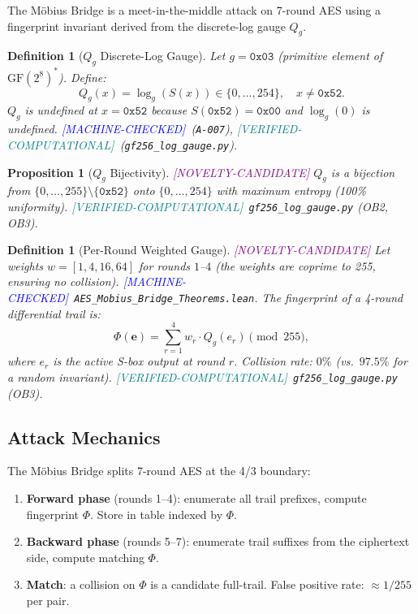 \documentclass[11pt,letterpaper]{article}
\newtheorem{definition}[theorem]{Definition}
\newtheorem{proposition}[theorem]{Proposition}
\newcommand{\MC}{\textcolor{blue}{[MACHINE-CHECKED]}}
\newcommand{\VC}{\textcolor{teal}{[VERIFIED-COMPUTATIONAL]}}
\newcommand{\CN}{\textcolor{purple}{[NOVELTY-CANDIDATE]}}
\begin{document}
The M\"obius Bridge is a meet-in-the-middle attack on 7-round AES using a
fingerprint invariant derived from the discrete-log gauge $Q_g$.

\begin{definition}[$Q_g$ Discrete-Log Gauge]
\label{def:qg}
Let $g = \mathtt{0x03}$ (primitive element of $\mathrm{GF}(2^8)^*$).
Define:
\[
Q_g(x) = \log_g(S(x)) \in \{0,\ldots,254\}, \quad x \neq \mathtt{0x52}.
\]
$Q_g$ is undefined at $x = \mathtt{0x52}$ because $S(\mathtt{0x52}) = \mathtt{0x00}$
and $\log_g(0)$ is undefined.
\MC\ (\texttt{A-007}), \VC\ (\texttt{gf256\_log\_gauge.py}).
\end{definition}

\begin{proposition}[$Q_g$ Bijectivity] \CN
$Q_g$ is a bijection from $\{0,\ldots,255\} \setminus \{\mathtt{0x52}\}$
onto $\{0,\ldots,254\}$ with maximum entropy (100\% uniformity).
\VC\ \texttt{gf256\_log\_gauge.py} (OB2, OB3).
\end{proposition}

\begin{definition}[Per-Round Weighted Gauge] \CN
Let weights $w = [1, 4, 16, 64]$ for rounds $1$--$4$ (the weights are
coprime to 255, ensuring no collision). \MC\ \texttt{AES\_Mobius\_Bridge\_Theorems.lean}.
The \emph{fingerprint} of a 4-round differential trail is:
\[
\Phi(\mathbf{e}) = \sum_{r=1}^4 w_r \cdot Q_g(e_r) \pmod{255},
\]
where $e_r$ is the active S-box output at round $r$.
Collision rate: $0\%$ (vs.\ $97.5\%$ for a random invariant).
\VC\ \texttt{gf256\_log\_gauge.py} (OB3).
\end{definition}

\subsection{Attack Mechanics}

The M\"obius Bridge splits 7-round AES at the 4/3 boundary:

\begin{enumerate}[nosep]
\item \textbf{Forward phase} (rounds 1--4): enumerate all trail prefixes,
  compute fingerprint $\Phi$.  Store in table indexed by $\Phi$.
\item \textbf{Backward phase} (rounds 5--7): enumerate trail suffixes from
  the ciphertext side, compute matching $\Phi$.
\item \textbf{Match}: a collision on $\Phi$ is a candidate full-trail.
  False positive rate: $\approx 1/255$ per pair.
\end{enumerate}
\end{document}
